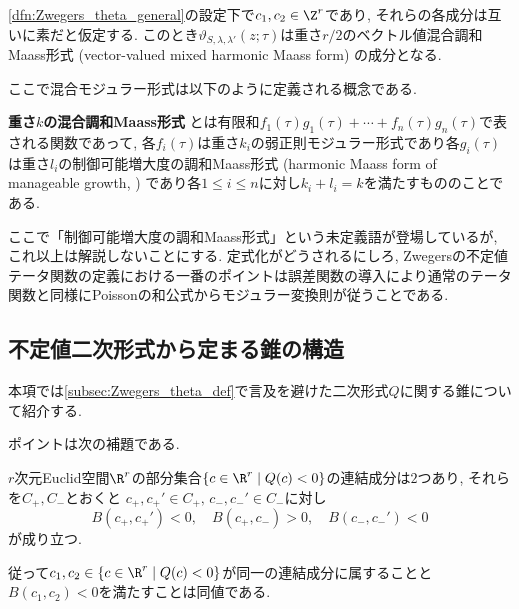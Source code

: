 \documentclass[11pt,b5paper,oneside,lualatex]{ltjsarticle} %
\numberwithin{equation}{section} %
\begin{document}
\begin{thm}
	\cref{dfn:Zwegers_theta_general}の設定下で$ c_1, c_2 \in \Z^r $であり, それらの各成分は互いに素だと仮定する. 
	このとき$ \vartheta_{S, \lambda, \lambda'} \left( z; \tau \right) $は重さ$ r/2 $のベクトル値混合調和Maass形式 (vector-valued mixed harmonic Maass form) の成分となる. 
\end{thm}

ここで混合モジュラー形式は以下のように定義される概念である. 

\begin{dfn}
	\textbf{重さ$ k $の混合調和Maass形式}%
	とは有限和$ f_1(\tau) g_1(\tau) + \cdots + f_n(\tau) g_n(\tau) $で表される関数であって, 各$ f_i(\tau) $は重さ$ k_i $の弱正則モジュラー形式であり各$ g_i(\tau) $は重さ$ l_i $の制御可能増大度の調和Maass形式 (harmonic Maass form of manageable growth, \cite[Definition 4.1]{BFOR}) であり各$ 1 \le i \le n $に対し$ k_i + l_i = k $を満たすもののことである. 
\end{dfn}

ここで「制御可能増大度の調和Maass形式」という未定義語が登場しているが, これ以上は解説しないことにする. 
定式化がどうされるにしろ, Zwegersの不定値テータ関数の定義における一番のポイントは誤差関数の導入により通常のテータ関数と同様にPoissonの和公式からモジュラー変換則が従うことである. 



\subsection{不定値二次形式から定まる錐の構造} \label{subsec:cone}


本項では\cref{subsec:Zwegers_theta_def}で言及を避けた二次形式$ Q $に関する錐について紹介する. 

ポイントは次の補題である. 

\begin{lem} \label{lem:cone}
	$ r $次元Euclid空間$ \R^r $の部分集合$ \{ c \in \R^r \mid Q(c) < 0 \} $の連結成分は$ 2 $つあり, それらを$ C_+, C_- $とおくと
	$ c_+, c_+' \in C_+, \, c_-, c_-' \in C_- $に対し
	\[
	B(c_+, c_+') < 0, \quad
	B(c_+, c_-) > 0, \quad
	B(c_-, c_-') < 0
	\]
	が成り立つ. 
	
	従って$ c_1, c_2 \in \{ c \in \R^r \mid Q(c) < 0 \} $が同一の連結成分に属することと$ B(c_1, c_2) < 0 $を満たすことは同値である. 
\end{lem}
\end{document}
